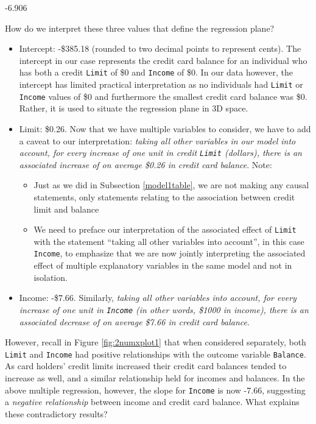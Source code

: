 \documentclass[12pt,]{krantz}
\providecommand{\tightlist}{%
  \setlength{\itemsep}{0pt}\setlength{\parskip}{0pt}}
\begin{document}
-6.906

How do we interpret these three values that define the regression plane?

\begin{itemize}
\tightlist
\item
  Intercept: -\$385.18 (rounded to two decimal points to represent
  cents). The intercept in our case represents the credit card balance
  for an individual who has both a credit \texttt{Limit} of \$0 and
  \texttt{Income} of \$0. In our data however, the intercept has limited
  practical interpretation as no individuals had \texttt{Limit} or
  \texttt{Income} values of \$0 and furthermore the smallest credit card
  balance was \$0. Rather, it is used to situate the regression plane in
  3D space.
\item
  Limit: \$0.26. Now that we have multiple variables to consider, we
  have to add a caveat to our interpretation: \emph{taking all other
  variables in our model into account, for every increase of one unit in
  credit \texttt{Limit} (dollars), there is an associated increase of on
  average \$0.26 in credit card balance}. Note:

  \begin{itemize}
  \tightlist
  \item
    Just as we did in Subsection \ref{model1table}, we are not making
    any causal statements, only statements relating to the association
    between credit limit and balance
  \item
    We need to preface our interpretation of the associated effect of
    \texttt{Limit} with the statement ``taking all other variables into
    account'', in this case \texttt{Income}, to emphasize that we are
    now jointly interpreting the associated effect of multiple
    explanatory variables in the same model and not in isolation.
  \end{itemize}
\item
  Income: -\$7.66. Similarly, \emph{taking all other variables into
  account, for every increase of one unit in \texttt{Income} (in other
  words, \$1000 in income), there is an associated decrease of on
  average \$7.66 in credit card balance}.
\end{itemize}

However, recall in Figure \ref{fig:2numxplot1} that when considered
separately, both \texttt{Limit} and \texttt{Income} had positive
relationships with the outcome variable \texttt{Balance}. As card
holders' credit limits increased their credit card balances tended to
increase as well, and a similar relationship held for incomes and
balances. In the above multiple regression, however, the slope for
\texttt{Income} is now -7.66, suggesting a \emph{negative relationship}
between income and credit card balance. What explains these
contradictory results?
\end{document}
